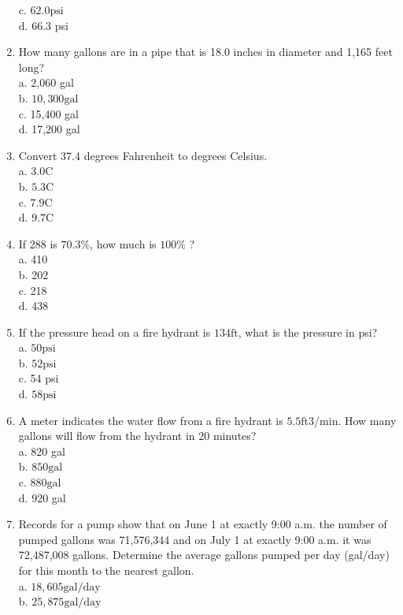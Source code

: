 \begin{enumerate}
c. $62.0 \mathrm{psi}$\\
d. 66.3 psi\\
\item How many gallons are in a pipe that is 18.0 inches in diameter and 1,165 feet long?\\
a. 2,060 gal\\
b. $10,300 \mathrm{gal}$\\
c. 15,400 gal\\
d. 17,200 gal\\
\item Convert 37.4 degrees Fahrenheit to degrees Celsius.\\
a. $3.0 \mathrm{C}$\\
b. $5.3 \mathrm{C}$\\
c. $7.9 \mathrm{C}$\\
d. $9.7 \mathrm{C}$\\
\item If 288 is $70.3 \%$, how much is $100 \%$ ?\\
a. 410\\
b. 202\\
c. 218\\
d. 438\\
\item If the pressure head on a fire hydrant is $134 \mathrm{ft}$, what is the pressure in psi?\\
a. $50 \mathrm{psi}$\\
b. $52 \mathrm{psi}$\\
c. 54 psi\\
d. $58 \mathrm{psi}$\\
\item A meter indicates the water flow from a fire hydrant is $5.5 \mathrm{ft} 3 / \mathrm{min}$. How many gallons will flow from the hydrant in 20 minutes?\\
a. 820 gal\\
b. $850 \mathrm{gal}$\\
c. $880 \mathrm{gal}$\\
d. 920 gal\\
\item Records for a pump show that on June 1 at exactly 9:00 a.m. the number of pumped gallons was 71,576,344 and on July 1 at exactly 9:00 a.m. it was 72,487,008 gallons. Determine the average gallons pumped per day (gal/day) for this month to the nearest gallon.\\
a. $18,605 \mathrm{gal} / \mathrm{day}$\\
b. $25,875 \mathrm{gal} / \mathrm{day}$\\

\end{enumerate}
